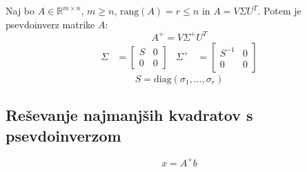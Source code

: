 \begin{multicols}{4}
Naj bo $A \in \mathbb{R}^{m\times n}$, $m \geq n$, $\text{rang}(A) = r \leq n$ in $A = V \Sigma U^T$.
Potem je psevdoinverz matrike $A$:
\[A^+ = V \Sigma^+ U^T\]
\begin{align*}
	\Sigma &= \begin{bmatrix}
		S & 0 \\ 0 & 0
	\end{bmatrix} &
	\Sigma^+ &= \begin{bmatrix}
		S^{-1} & 0 \\ 0 & 0
	\end{bmatrix}
\end{align*}
\[ S = \text{diag}(\sigma_1, \dots, \sigma_r) \]

\subsection{Reševanje najmanjših kvadratov s psevdoinverzom}
\[ x = A^+ b\]
\end{multicols}
